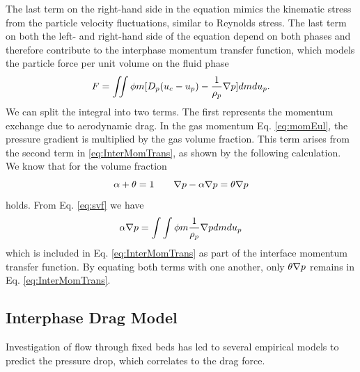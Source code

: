 The last term on the right-hand side in the equation mimics the kinematic stress from the particle velocity fluctuations, similar to Reynolds stress. The last term on both the left- and right-hand side of the equation depend on both phases and therefore contribute to the interphase momentum transfer function, which models the particle force per unit volume on the fluid phase
\begin{equation}
    \label{eq:InterMomTrans}
    \F = \MultiIntegral{2} \pd \m [\d (\uf - \up) - \dfrac{1}{\rp} \nabla \p] d\m d\up.
\end{equation}
We can split the integral into two terms. The first represents the momentum exchange due to aerodynamic drag.
In the gas momentum Eq. \eqref{eq:momEul}, the pressure gradient is multiplied by the gas volume fraction. This term arises from the second term in \eqref{eq:InterMomTrans}, as shown by the following calculation.
We know that for the volume fraction
\begin{equation}
    \alpha + \theta = 1 \qquad \nabla p - \alpha \nabla p = \theta \nabla p
\end{equation}
holds.
From Eq. \eqref{eq:svf} we have
\begin{equation}
    \alpha \nabla p =  \int \int \phi m \dfrac{1}{\rho_p} \nabla p dm du_p
\end{equation}
which is included in Eq. \eqref{eq:InterMomTrans} as part of the interface momentum transfer function. 
By equating both terms with one another, only $\theta \nabla p$ remains in Eq. \eqref{eq:InterMomTrans}.



\subsection{Interphase Drag Model}
\label{sec:MPDrag}
Investigation of flow through fixed beds has led to several empirical models to predict the pressure drop, which correlates to the drag force. 


